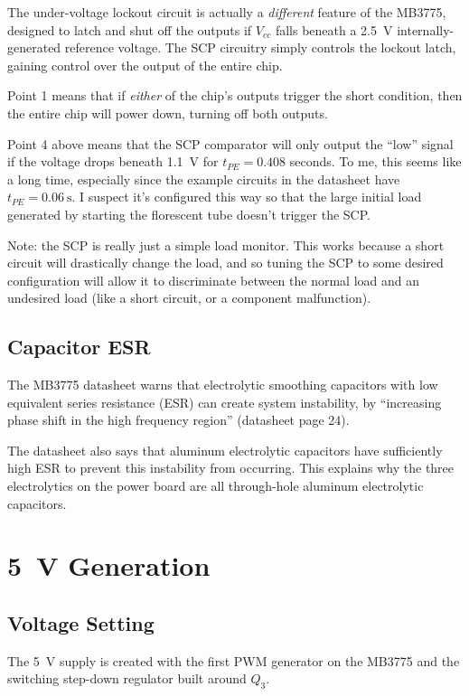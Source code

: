 \documentclass{article}
\newcommand{\Vcc}{$V_{cc}$}
\newcommand{\model}{\textsf}
\begin{document}
The under-voltage lockout circuit is actually a \emph{different}
feature of the \model{MB3775}, designed to latch and shut off the
outputs if \Vcc{} falls beneath a \qty{2.5}{\volt}
internally-generated reference voltage. The SCP circuitry simply
controls the lockout latch, gaining control over the output of the
entire chip.

Point 1 means that if \emph{either} of the chip's outputs trigger the
short condition, then the entire chip will power down, turning off
both outputs.

Point 4 above means that the SCP comparator will only output the
``low'' signal if the voltage drops beneath \qty{1.1}{\volt} for
$t_{PE} = 0.408$ seconds. To me, this seems like a long time,
especially since the example circuits in the datasheet have
$t_{PE} = \qty{0.06}{\second}$. I suspect it's configured this way so
that the large initial load generated by starting the florescent tube
doesn't trigger the SCP.

Note: the SCP is really just a simple load monitor. This works because
a short circuit will drastically change the load, and so tuning the
SCP to some desired configuration will allow it to discriminate
between the normal load and an undesired load (like a short circuit, or
a component malfunction).


\subsection{Capacitor ESR}
The \model{MB3775} datasheet warns that electrolytic smoothing
capacitors with low equivalent series resistance (ESR) can create
system instability, by ``increasing phase shift in the high frequency
region'' (datasheet page 24).

The datasheet also says that aluminum electrolytic capacitors have
sufficiently high ESR to prevent this instability from occurring. This
explains why the three electrolytics on the power board are all
through-hole aluminum electrolytic capacitors.

\section{\qty{5}{\volt} Generation}
\subsection{Voltage Setting}
The \qty{5}{\volt} supply is created with the first PWM generator on
the \model{MB3775} and the switching step-down regulator built around
$Q_3$.
\end{document}
